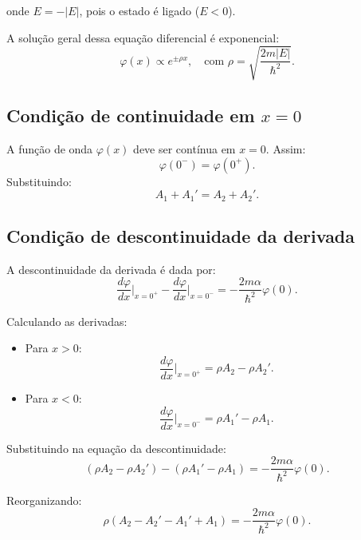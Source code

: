 \documentclass[a4paper,12pt]{article}
\begin{document}
\begin{enumerate}
onde \( E = -|E| \), pois o estado é ligado (\( E < 0 \)).

A solução geral dessa equação diferencial é exponencial:
\begin{equation}
\varphi(x) \propto e^{\pm \rho x}, \quad \text{com } \rho = \sqrt{\frac{2m|E|}{\hbar^2}}.
\end{equation}

\subsection*{Condição de continuidade em \( x = 0 \)}
A função de onda \( \varphi(x) \) deve ser contínua em \( x = 0 \). Assim:
\begin{equation}
\varphi(0^-) = \varphi(0^+).
\end{equation}
Substituindo:
\begin{equation}
A_1 + A_1' = A_2 + A_2'.
\end{equation}

\subsection*{Condição de descontinuidade da derivada}
A descontinuidade da derivada é dada por:
\begin{equation}
\frac{d\varphi}{dx} \Big|_{x=0^+} - \frac{d\varphi}{dx} \Big|_{x=0^-} = -\frac{2m\alpha}{\hbar^2} \varphi(0).
\end{equation}

Calculando as derivadas:
\begin{itemize}
    \item Para \( x > 0 \):
    \begin{equation}
    \frac{d\varphi}{dx} \Big|_{x=0^+} = \rho A_2 - \rho A_2'.
    \end{equation}
    \item Para \( x < 0 \):
    \begin{equation}
    \frac{d\varphi}{dx} \Big|_{x=0^-} = \rho A_1' - \rho A_1.
    \end{equation}
\end{itemize}

Substituindo na equação da descontinuidade:
\begin{equation}
\left( \rho A_2 - \rho A_2' \right) - \left( \rho A_1' - \rho A_1 \right) = -\frac{2m\alpha}{\hbar^2} \varphi(0).
\end{equation}

Reorganizando:
\begin{equation}
\rho (A_2 - A_2' - A_1' + A_1) = -\frac{2m\alpha}{\hbar^2} \varphi(0).
\end{equation}


\end{enumerate}
\end{document}
